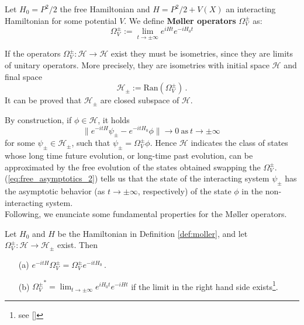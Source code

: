 \begin{definition}
\label{def:moller}
Let $H_0=P^2/2$ the free Hamiltonian and $H=P^2/2+V(X)$ an interacting Hamiltonian for some potential $V$. We define \textbf{M\o{}ller operators} $\Omega_V^\pm$ as:
\begin{equation}
\Omega_V^\pm:=\lim_{t\to\pm\infty}e^{iHt}e^{-iH_0t}
\end{equation}
\end{definition}
\begin{oss}
	If the operators $\Omega_V^\pm:\mathcal{H}\to\mathcal{H}$ exist they must be isometries, since they are limits of unitary operators. More precisely, they are isometries with initial space $\mathcal{H}$ and final space
	\begin{equation}
		\mathcal{H}_\pm:=\mathrm{Ran}(\Omega_V^\pm)\,.
	\end{equation}
	It can be proved that $\mathcal{H}_\pm$ are closed subspace of $\mathcal{H}$.  
\end{oss}
By construction, if $\phi\in\mathcal{H}$, it holds
\begin{equation}
	\|e^{-itH}\psi_\pm-e^{-itH_0}\phi\|\to 0\ \text{as}\ t\to\pm\infty\,
	\label{eq:free_asymptotics_2}
\end{equation}
for some $\psi_\pm\in\mathcal{H}_\pm$, such that $\psi_\pm=\Omega_V^\pm\phi$. Hence $\mathcal{H}$ indicates the class of states whose long time future evolution, or long-time past evolution, can be approximated by the free evolution of the states obtained swapping the $\Omega_V^\pm$. (\ref{eq:free_asymptotics_2}) tells us that the state of the interacting system $\psi_\pm$ has the asymptotic behavior (as $t\to\pm\infty$, respectively) of the state $\phi$ in the non-interacting system.\\
Following, we enunciate some fundamental properties for the M\o{}ller operators.

\begin{theorem}
Let $H_0$ and $H$ be the Hamiltonian in Definition \ref{def:moller}, and let $\Omega_V^\pm:\mathcal{H}\to\mathcal{H}_\pm$ exist. Then 
\begin{itemize}
	\item[(a)] $e^{-itH}\Omega_V^\pm=\Omega_V^\pm e^{-itH_0}\,.$
	\item[(b)] ${\Omega_V^\pm}^*=\lim_{t\to\pm\infty}e^{iH_0t}e^{-iHt}$ if the limit in the right hand side exists\footnote{see [\citealp[Th. 3.5]{kato}]}.
\end{itemize}
\end{theorem}


